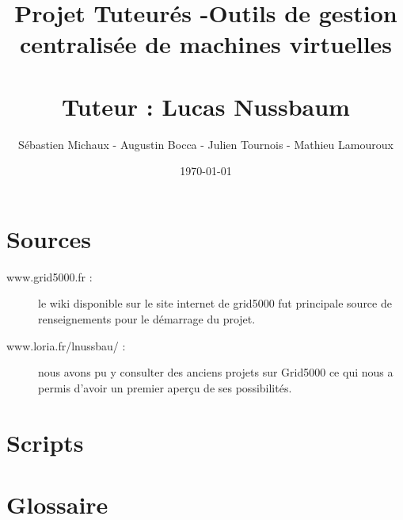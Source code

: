 \documentclass{report}[a4paper,12pt]
\title{Projet Tuteurés -Outils de gestion centralisée de machines virtuelles\\\\Tuteur : Lucas Nussbaum}
\author{Sébastien Michaux - Augustin Bocca - Julien Tournois - Mathieu Lamouroux}
\date{\today}
\begin{document}
\maketitle
\begin{abstract}
\end{abstract}

\newpage
\tableofcontents
\newpage




\appendix
\chapter{Sources}
\begin{description}
\item[www.grid5000.fr : ]le wiki disponible sur le site internet de grid5000 fut principale source de renseignements pour le démarrage du projet.
\item[www.loria.fr/lnussbau/ : ]nous avons pu y consulter des anciens projets sur Grid5000 ce qui nous a permis d'avoir un premier aperçu de ses possibilités.
\end{description}
\chapter{Scripts}

\newpage


\newpage

\chapter{Glossaire}
\begin{description}
\item[]
\item[]
\end{description}
\end{document}
